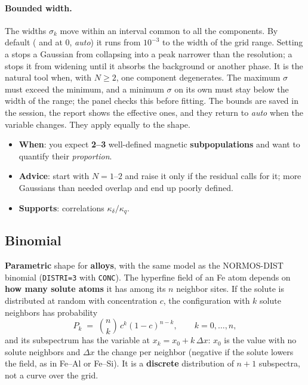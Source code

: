 \paragraph{Bounded width.} The widths $\sigma_k$ move within an interval common
to all the components. By default ( and  at
$0$, \emph{auto}) it runs from $10^{-3}$ to the width of the grid range. Setting a
 stops a Gaussian from collapsing into a peak narrower than the
resolution; a  stops it from widening until it absorbs the
background or another phase. It is the natural tool when, with $N\ge2$, one
component degenerates. The maximum $\sigma$ must exceed the minimum, and a minimum
$\sigma$ on its own must stay below the width of the range; the panel checks this
before fitting. The bounds are saved in the session, the report shows the
effective ones, and they return to \emph{auto} when the variable changes. They
apply equally to the  shape.

\begin{itemize}[nosep]
  \item \textbf{When}: you expect \textbf{2--3} well-defined magnetic
        \textbf{subpopulations} and want to quantify their \emph{proportion}.
  \item \textbf{Advice}: start with $N=1$--$2$ and raise it only if the residual
        calls for it; more Gaussians than needed overlap and end up poorly defined.
  \item \textbf{Supports}: correlations $\kappa_\delta/\kappa_q$.
\end{itemize}

\subsection{Binomial}
\label{sec:forma-binomial}

\textbf{Parametric} shape for \textbf{alloys}, with the same model as the
NORMOS-DIST binomial (\texttt{DISTRI=3} with \texttt{CONC}). The hyperfine field
of an Fe atom depends on \textbf{how many solute atoms} it has among its $n$
neighbor sites. If the solute is distributed at random with concentration $c$, the
configuration with $k$ solute neighbors has probability
\[
  P_k \;=\; \binom{n}{k}\, c^k (1-c)^{n-k}, \qquad k = 0,\ldots,n,
\]
and its subspectrum has the variable at $x_k = x_0 + k\,\Delta x$: $x_0$ is the
value with no solute neighbors and $\Delta x$ the change per neighbor (negative
if the solute lowers the field, as in Fe--Al or Fe--Si). It is a
\textbf{discrete} distribution of $n+1$ subspectra, not a curve over the grid.

